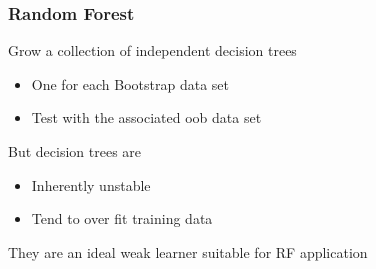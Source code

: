 \documentclass[xcolor=svgnames]{beamer}\usepackage[]{graphicx}\usepackage[]{color}
\begin{document}
\begin{frame}
\frametitle{Random Forest}
Grow a collection of independent decision trees
\begin{itemize}
\item One for each Bootstrap data set
\item Test with the associated oob data set
\end{itemize}

But decision trees are

\begin{itemize}
\item Inherently unstable
\item Tend to over fit training data
\end{itemize}

They are an ideal weak learner suitable for RF application

\end{frame}
\end{document}
